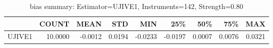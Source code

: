 \begin{table}[ht]
\centering
\caption{bias summary: Estimator=UJIVE1, Instruments=142, Strength=0.80}
\begin{tabular}{lrrrrrrrr}
\toprule
 & COUNT & MEAN & STD & MIN & 25\% & 50\% & 75\% & MAX \\
\midrule
UJIVE1 & 10.0000 & -0.0012 & 0.0194 & -0.0233 & -0.0197 & 0.0007 & 0.0076 & 0.0321 \\
\bottomrule
\end{tabular}
\end{table}
